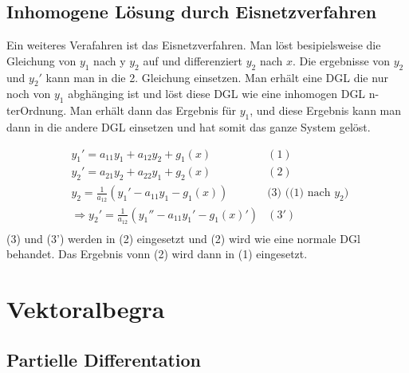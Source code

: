 \documentclass[a4paper,10pt]{scrartcl}
\begin{document}
        \subsection*{Inhomogene Lösung durch Eisnetzverfahren}
            Ein weiteres Verafahren ist das Eisnetzverfahren. Man löst besipielsweise die Gleichung von \(y_1\) nach y
            \(y_2\) auf und differenziert \(y_2\) nach \(x\). Die ergebnisse von \(y_2\) und \(y_2'\) kann man in die 2. Gleichung einsetzen.
            Man erhält eine DGL die nur noch von \(y_1\) abghänging ist und löst diese DGL wie eine inhomogen DGL n-terOrdnung. Man 
            erhält dann das Ergebnis für \(y_1\), und diese Ergebnis kann man dann in die andere DGL einsetzen und hat somit das ganze System gelöst.
            
            \begin{equation*}
                \begin{aligned}
                    & y_1' = a_{11}y_1 + a_{12}y_2 + g_1(x) &  (1)\\
                    & y_2' = a_{21}y_2 + a_{22}y_1 + g_2(x) &  (2)\\
                    & y_2 = \frac{1}{a_{12}} (y_1' - a_{11}y_1 - g_1(x)) & \text{(3) ((1) nach  \(y_2\)) } \\
                    & \Rightarrow y_2' = \frac{1}{a_{12}} (y_1'' - a_{11}y_1' - g_1(x)') & (3') \\
                \end{aligned}
            \end{equation*}
            (3) und (3') werden in (2) eingesetzt und (2) wird wie eine normale DGl behandet. Das Ergebnis vonn (2) wird dann in (1) eingesetzt.
    
    \section{Vektoralbegra}

    \subsection{Partielle Differentation}
\end{document}
